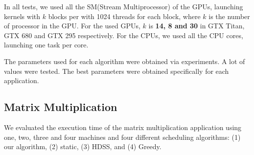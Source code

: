 \documentclass[journal]{IEEEtran}
\begin{document}
In all tests, we used all the SM(Stream Multiprocessor) of the GPUs, launching kernels with
$k$ blocks per with 1024 threads for each block, where $k$ is the number of
processor in the GPU. For the used GPUs, $k$ is \textbf{14, 8 and 30} in GTX
Titan, GTX 680 and GTX 295 respectively. For the CPUs, we used all the CPU
cores, launching one task per core.

The parameters used for each algorithm were obtained via experiments. A lot of values ​​were tested. The best parameters were obtained specifically for each application.


\subsection{Matrix Multiplication}

We evaluated the execution time of the matrix multiplication application using
one, two, three and four machines and four different scheduling algorithms: (1) our
algorithm, (2) static, (3) HDSS, and (4) Greedy. 
\end{document}
